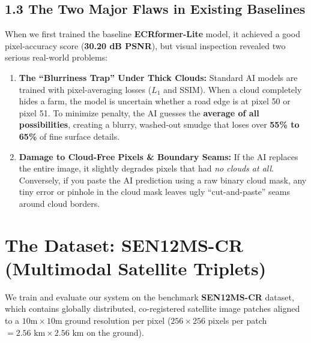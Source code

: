 \documentclass[11pt,a4paper]{article}
\begin{document}
\subsection{1.3 The Two Major Flaws in Existing Baselines}
When we first trained the baseline \textbf{ECRformer-Lite} model, it achieved a good pixel-accuracy score (\textbf{30.20 dB PSNR}), but visual inspection revealed two serious real-world problems:
\begin{enumerate}[leftmargin=1.5em, itemsep=2pt]
    \item \textbf{The ``Blurriness Trap'' Under Thick Clouds:} Standard AI models are trained with pixel-averaging losses ($L_1$ and SSIM). When a cloud completely hides a farm, the model is uncertain whether a road edge is at pixel 50 or pixel 51. To minimize penalty, the AI guesses the \textbf{average of all possibilities}, creating a blurry, washed-out smudge that loses over \textbf{55\% to 65\%} of fine surface details.
    \item \textbf{Damage to Cloud-Free Pixels \& Boundary Seams:} If the AI replaces the entire image, it slightly degrades pixels that had \textit{no clouds at all}. Conversely, if you paste the AI prediction using a raw binary cloud mask, any tiny error or pinhole in the cloud mask leaves ugly ``cut-and-paste'' seams around cloud borders.
\end{enumerate}

\section{The Dataset: SEN12MS-CR (Multimodal Satellite Triplets)}

We train and evaluate our system on the benchmark \textbf{SEN12MS-CR} dataset, which contains globally distributed, co-registered satellite image patches aligned to a $10\text{m}\times 10\text{m}$ ground resolution per pixel ($256 \times 256$ pixels per patch $= 2.56\text{ km} \times 2.56\text{ km}$ on the ground).
\end{document}
